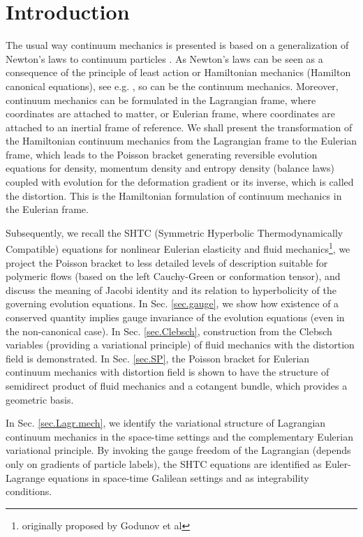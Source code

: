 \documentclass[
10pt, %
a4paper, %
oneside, %
headinclude,footinclude, %
BCOR5mm, %
]{scrartcl}
\begin{document}
\section{Introduction}
The usual way continuum mechanics is presented is based on a generalization of Newton's laws to 
continuum particles \cite{BookGurtin,Marsden-hughes,Simo1988}. As Newton's laws can be seen as a consequence 
of the principle of least action or Hamiltonian mechanics (Hamilton canonical equations), see e.g. \cite{Landau1}, so can be 
the continuum mechanics. Moreover, continuum mechanics can be formulated in the Lagrangian frame, 
where coordinates are attached to matter, or Eulerian frame, where coordinates are attached to an 
inertial frame of reference. We shall present the transformation of the Hamiltonian continuum 
mechanics from the Lagrangian frame to the Eulerian frame, which leads to the Poisson bracket 
generating reversible evolution equations for density, momentum density and entropy density 
(balance laws) coupled with evolution for the deformation gradient or its inverse, which is called 
the distortion. This is the Hamiltonian formulation of continuum mechanics in the Eulerian 
frame.

Subsequently, we recall the SHTC (Symmetric Hyperbolic Thermodynamically Compatible) equations for 
nonlinear Eulerian elasticity and fluid mechanics\footnote{originally proposed by Godunov et al\cite{Godunov-interesting,God-Siberian}}, we project the Poisson bracket to less detailed 
levels of description suitable for polymeric flows (based on the left Cauchy-Green or conformation 
tensor), and discuss the meaning of Jacobi identity and its relation to hyperbolicity of the 
governing evolution equations. In Sec. \ref{sec.gauge}, we show how existence 
of a conserved quantity implies gauge invariance of the evolution equations 
(even in the non-canonical case). In Sec. \ref{sec.Clebsch}, construction from 
the Clebsch variables 
(providing a variational principle) of fluid mechanics with the distortion field is demonstrated. 
In Sec. \ref{sec.SP}, the Poisson bracket for Eulerian continuum mechanics with 
distortion field is 
shown to have the structure of semidirect product of fluid mechanics and a cotangent bundle, which 
provides a geometric basis.

In Sec. \ref{sec.Lagr.mech}, we identify the variational structure of 
Lagrangian continuum 
mechanics 
in the space-time settings and the complementary Eulerian variational principle. By invoking the 
gauge freedom of the Lagrangian (depends only on gradients of particle labels), the SHTC equations 
are identified as Euler-Lagrange equations in space-time Galilean settings and as integrability 
conditions.
\end{document}
